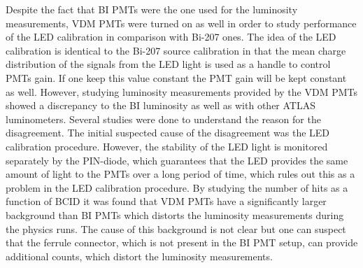 Despite the fact that BI PMTs were the one used for the luminosity measurements, 
VDM PMTs were turned on as well in order to study performance of the LED calibration in comparison with Bi-207 ones.
The idea of the LED calibration is identical to the Bi-207 source calibration in that the mean charge distribution of the signals from the LED light
is used as a handle to control PMTs gain. If one keep this value constant the  PMT gain will be kept constant as well.
However, studying luminosity measurements provided by the VDM PMTs showed a discrepancy to the BI luminosity as well as with other ATLAS
luminometers. Several studies were done to understand the reason for the disagreement.
The initial suspected cause of the disagreement was the LED calibration procedure.
However, the stability of the LED light is monitored separately by the PIN-diode, which guarantees that the LED provides the same 
amount of light to the PMTs over a long period of time, which rules out this as a problem in the LED calibration procedure.
By studying the number of hits as a function of BCID it was found that VDM PMTs have a significantly larger
background than BI PMTs which distorts the luminosity measurements during the physics runs. The cause of this background is not clear but one can
suspect that the ferrule connector, which is not present in the BI PMT setup, can provide additional counts, which distort the luminosity measurements. 

% 


